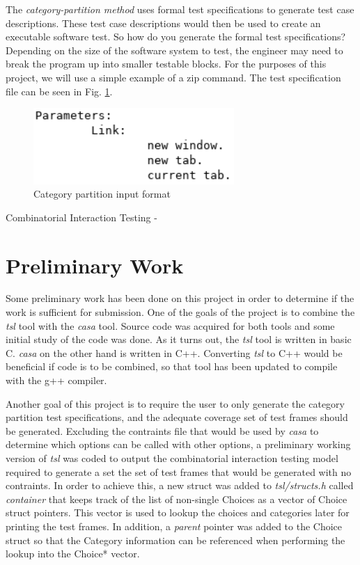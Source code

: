 \documentclass[a4full,12pt]{article}
\begin{document}
The \emph{category-partition method} uses formal test specifications to generate
  test case descriptions. These test case descriptions would then be used to
  create an executable software test. So how do you generate the formal test 
  specifications? Depending on the size of the software system to test, the 
  engineer may need to break the program up into smaller testable blocks. For 
  the purposes of this project, we will use a simple example of a zip command.
  The test specification file can be seen in Fig. \ref{fig:tsl_input}.
\begin{figure}[-htb]
\centering
\includegraphics[width=3in,keepaspectratio]{tsl_input.png}
\caption{Category partition input format}
\label{fig:tsl_input}
\end{figure}



Combinatorial Interaction Testing -

\section{Preliminary Work}
Some preliminary work has been done on this project in order to determine if
  the work is sufficient for submission. One of the goals of the project is to
  combine the \emph{tsl} tool with the \emph{casa} tool. Source code was
  acquired for both tools and some initial study of the code was done. As it
  turns out, the \emph{tsl} tool is written in basic C. \emph{casa} on the other
  hand is written in C++. Converting \emph{tsl} to C++ would be beneficial if
  code is to be combined, so that tool has been updated to compile with the g++
  compiler.
  
Another goal of this project is to require the user to only generate the
  category partition test specifications, and the adequate coverage set of test
  frames should be generated. Excluding the contraints file that would be used 
  by \emph{casa} to determine which options can be called with other options, a
  preliminary working version of \emph{tsl} was coded to output the 
  combinatorial interaction testing model required to generate a set the set of
  test frames that would be generated with no contraints. In order to achieve
  this, a new struct was added to \emph{tsl/structs.h} called \emph{container} that
  keeps track of the list of non-single Choices as a vector of Choice struct
  pointers. This vector is used to lookup the choices and categories later for
  printing the test frames. In addition, a \emph{parent} pointer was added to
  the Choice struct so that the Category information can be referenced when
  performing the lookup into the Choice* vector.
  
\end{document}

